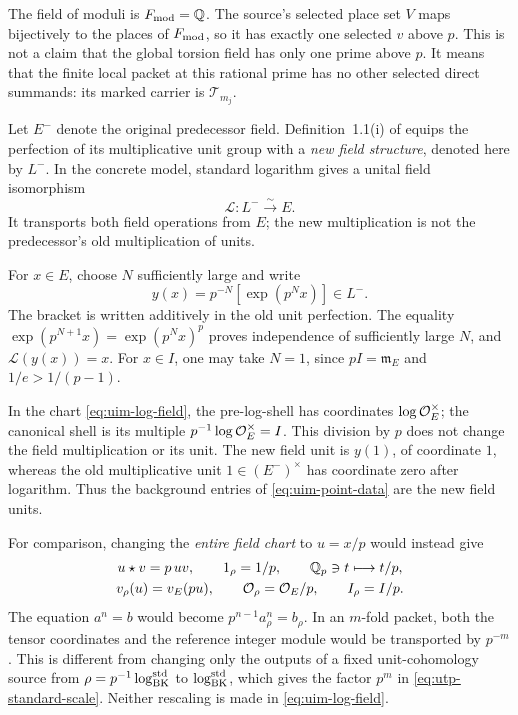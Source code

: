 The field of moduli is \(F_{\rm mod}=\mathbb Q\).
The source's selected place set \(V\) maps bijectively to
the places of \(F_{\rm mod}\), so it has exactly one
selected \(v\) above \(p\). This is not a claim that the
global torsion field has only one prime above \(p\).
It means that the finite local packet at this rational
prime has no other selected direct summands:
its marked carrier is \(\mathcal T_{m_j}\).

Let \(E^-\) denote the original predecessor field.
Definition~1.1(i) of \cite[pp.~23--25]{IUT3} equips the
perfection of its multiplicative unit group with a
\emph{new field structure}, denoted here by \(L^-\).
In the concrete model, standard logarithm gives a
unital field isomorphism
\begin{equation}\label{eq:uim-log-field}
                 \mathcal L:L^-\xrightarrow{\sim}E.
\end{equation}
It transports both field operations from \(E\);
the new multiplication is not the predecessor's
old multiplication of units.

For \(x\in E\), choose \(N\) sufficiently large and write
\begin{equation}\label{eq:uim-perfect-unit}
       y(x)=p^{-N}[\exp(p^Nx)]\in L^- .
\end{equation}
The bracket is written additively in the old unit
perfection. The equality
\(\exp(p^{N+1}x)=\exp(p^Nx)^p\) proves independence of
sufficiently large \(N\), and
\(\mathcal L(y(x))=x\).
For \(x\in I\), one may take \(N=1\), since
\(pI=\mathfrak m_E\) and \(1/e>1/(p-1)\).

In the chart \eqref{eq:uim-log-field}, the pre-log-shell
has coordinates \(\log\mathcal O_E^\times\); the canonical
shell is its multiple \(p^{-1}\log\mathcal O_E^\times=I\).
This division by \(p\) does not change the field
multiplication or its unit. The new field unit is
\(y(1)\), of coordinate \(1\), whereas the old
multiplicative unit \(1\in(E^-)^\times\) has coordinate
zero after logarithm. Thus the background entries of
\eqref{eq:uim-point-data} are the new field units.

For comparison, changing the \emph{entire field chart}
to \(u=x/p\) would instead give
\begin{equation}\label{eq:uim-rescaled-field}
 \begin{gathered}
 u\star v=p\,uv,\qquad 1_\rho=1/p,\qquad
 \mathbb Q_p\ni t\longmapsto t/p,\\
 v_\rho(u)=v_E(pu),\qquad
 \mathcal O_\rho=\mathcal O_E/p,\qquad I_\rho=I/p .
 \end{gathered}
\end{equation}
The equation \(a^n=b\) would become
\(p^{n-1}a_\rho^n=b_\rho\). In an \(m\)-fold packet,
both the tensor coordinates and the reference integer
module would be transported by \(p^{-m}\).
This is different from changing only the outputs of a
fixed unit-cohomology source from
\(\rho=p^{-1}\log_{\rm BK}^{\rm std}\) to
\(\log_{\rm BK}^{\rm std}\), which gives the factor
\(p^m\) in \eqref{eq:utp-standard-scale}.
Neither rescaling is made in \eqref{eq:uim-log-field}.

